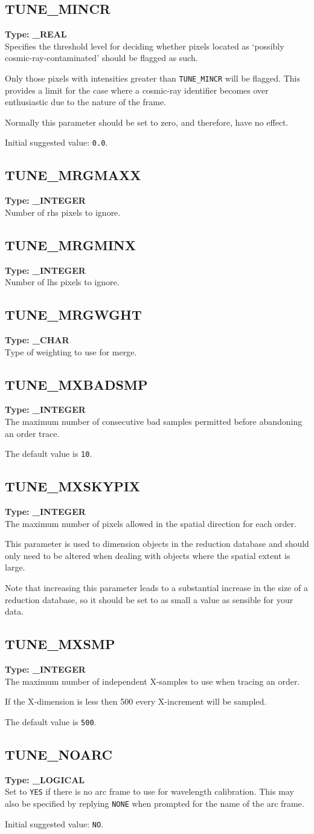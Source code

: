 \documentclass[11pt,twoside]{article}
\makeatletter
\newcommand{\xlabel}[1]{}
\newcommand{\indexcmdname}[1]{\index{#1@\protect\cmdname{#1}}}
\renewcommand{\indexcmdname}[1]{}
\newcommand{\cmdname}{\begingroup \catcode`\_=12 \realcmdname}
\newcommand{\realcmdname}[1]{\endgroup\texttt{#1}}
\newcommand{\echparameter}[4]
{
\item [#1 = #3] \mbox{}\label{par_#2}\indexcmdname{#2}
\\
#4
}
\renewcommand{\echparameter}[4]
{
  \subsection{\xlabel{par_#2}\label{par_#2}{\bf #1}}
  {\bf Type: #3}\\
#4
}
\makeatother
\begin{document}
\echparameter{TUNE\_MINCR}{TUNE_MINCR}{
 \_REAL
}{
 Specifies the threshold level for deciding whether pixels located
 as `possibly cosmic-ray-contaminated' should be flagged as such.

 Only those pixels with intensities greater than {\tt TUNE\_MINCR} will be
 flagged.  This provides a limit for the case where a cosmic-ray
 identifier becomes over enthusiastic due to the nature of the frame.

 Normally this parameter should be set to zero, and therefore,
 have no effect.

 Initial suggested value: \texttt{0.0}.
}

\echparameter{TUNE\_MRGMAXX}{TUNE_MRGMAXX}{
 \_INTEGER
}{
 Number of rhs pixels to ignore.
}

\echparameter{TUNE\_MRGMINX}{TUNE_MRGMINX}{
 \_INTEGER
}{
 Number of lhs pixels to ignore.
}

\echparameter{TUNE\_MRGWGHT}{TUNE_MRGWGHT}{
 \_CHAR
}{
 Type of weighting to use for merge.
}

\echparameter{TUNE\_MXBADSMP}{TUNE_MXBADSMP}{
 \_INTEGER
}{
 The maximum number of consecutive bad samples permitted
 before abandoning an order trace.

 The default value is \texttt{10}.
}

\echparameter{TUNE\_MXSKYPIX}{TUNE_MXSKYPIX}{
 \_INTEGER
}{
 The maximum number of pixels allowed in the spatial direction for
 each order.

 This parameter is used to dimension objects in the reduction database
 and should only need to be altered when dealing with
 objects where the spatial extent is large.

 Note that increasing this parameter leads to a substantial increase
 in the size of a reduction database, so it should be set to as
 small a value as sensible for your data.
}

\echparameter{TUNE\_MXSMP}{TUNE_MXSMP}{
 \_INTEGER
}{
 The maximum number of independent X-samples to use when tracing an order.

 If the X-dimension is less then 500 every X-increment will be sampled.

 The default value is \texttt{500}.
}

\echparameter{TUNE\_NOARC}{TUNE_NOARC}{
 \_LOGICAL
}{
 Set to \texttt{YES} if there is no arc frame to use for wavelength
 calibration.  This may also be specified by replying \texttt{NONE} when
 prompted for the name of the arc frame.

 Initial suggested value: \texttt{NO}.
}
\end{document}
